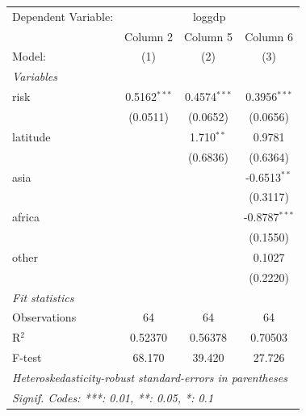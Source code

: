 
\begingroup
\centering
\begin{tabular}{lccc}
   \tabularnewline \midrule \midrule
   Dependent Variable: & \multicolumn{3}{c}{loggdp}\\
                & Column 2       & Column 5       & Column 6 \\   
   Model:       & (1)            & (2)            & (3)\\  
   \midrule
   \emph{Variables}\\
   risk         & 0.5162$^{***}$ & 0.4574$^{***}$ & 0.3956$^{***}$\\   
                & (0.0511)       & (0.0652)       & (0.0656)\\   
   latitude     &                & 1.710$^{**}$   & 0.9781\\   
                &                & (0.6836)       & (0.6364)\\   
   asia         &                &                & -0.6513$^{**}$\\   
                &                &                & (0.3117)\\   
   africa       &                &                & -0.8787$^{***}$\\   
                &                &                & (0.1550)\\   
   other        &                &                & 0.1027\\   
                &                &                & (0.2220)\\   
   \midrule
   \emph{Fit statistics}\\
   Observations & 64             & 64             & 64\\  
   R$^2$        & 0.52370        & 0.56378        & 0.70503\\  
   F-test       & 68.170         & 39.420         & 27.726\\  
   \midrule \midrule
   \multicolumn{4}{l}{\emph{Heteroskedasticity-robust standard-errors in parentheses}}\\
   \multicolumn{4}{l}{\emph{Signif. Codes: ***: 0.01, **: 0.05, *: 0.1}}\\
\end{tabular}
\par\endgroup


